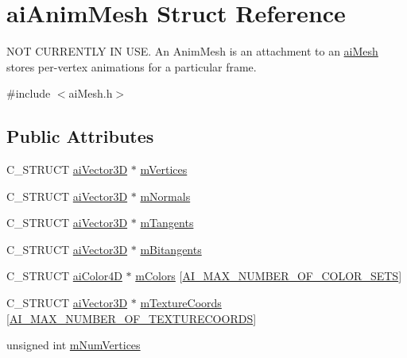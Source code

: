 \hypertarget{structai_anim_mesh}{\section{ai\-Anim\-Mesh Struct Reference}
\label{structai_anim_mesh}
}


N\-O\-T C\-U\-R\-R\-E\-N\-T\-L\-Y I\-N U\-S\-E. An Anim\-Mesh is an attachment to an \hyperlink{structai_mesh}{ai\-Mesh} stores per-\/vertex animations for a particular frame.  




{\ttfamily \#include $<$ai\-Mesh.\-h$>$}

\subsection*{Public Attributes}
\begin{DoxyCompactItemize}
\item 
C\-\_\-\-S\-T\-R\-U\-C\-T \hyperlink{structai_vector3_d}{ai\-Vector3\-D} $\ast$ \hyperlink{structai_anim_mesh_a0ac2dd4c1afd23e6a9293b1d0ded3060}{m\-Vertices}
\item 
C\-\_\-\-S\-T\-R\-U\-C\-T \hyperlink{structai_vector3_d}{ai\-Vector3\-D} $\ast$ \hyperlink{structai_anim_mesh_a64a07a8c5c419b1e006c5302bca4d334}{m\-Normals}
\item 
C\-\_\-\-S\-T\-R\-U\-C\-T \hyperlink{structai_vector3_d}{ai\-Vector3\-D} $\ast$ \hyperlink{structai_anim_mesh_a95dcc49c6d5ecc570ceb54552a0a9625}{m\-Tangents}
\item 
C\-\_\-\-S\-T\-R\-U\-C\-T \hyperlink{structai_vector3_d}{ai\-Vector3\-D} $\ast$ \hyperlink{structai_anim_mesh_a7d60acf4d2b4b59dcc6c88956bfae85f}{m\-Bitangents}
\item 
C\-\_\-\-S\-T\-R\-U\-C\-T \hyperlink{structai_color4_d}{ai\-Color4\-D} $\ast$ \hyperlink{structai_anim_mesh_a4f062d9fac71c6b367fdf0f8638e1ca5}{m\-Colors} \mbox{[}\hyperlink{ai_mesh_8h_a74ea1282873ac4b111b48d2380c26bdc}{A\-I\-\_\-\-M\-A\-X\-\_\-\-N\-U\-M\-B\-E\-R\-\_\-\-O\-F\-\_\-\-C\-O\-L\-O\-R\-\_\-\-S\-E\-T\-S}\mbox{]}
\item 
C\-\_\-\-S\-T\-R\-U\-C\-T \hyperlink{structai_vector3_d}{ai\-Vector3\-D} $\ast$ \hyperlink{structai_anim_mesh_ad24a0451adeb845a53eb2351b9462e0a}{m\-Texture\-Coords} \mbox{[}\hyperlink{ai_mesh_8h_a335874c5058c7f1e866eb953bf192258}{A\-I\-\_\-\-M\-A\-X\-\_\-\-N\-U\-M\-B\-E\-R\-\_\-\-O\-F\-\_\-\-T\-E\-X\-T\-U\-R\-E\-C\-O\-O\-R\-D\-S}\mbox{]}
\item 
unsigned int \hyperlink{structai_anim_mesh_a6bb0d45317a1bbea7f2b7f8191d0c436}{m\-Num\-Vertices}
\end{DoxyCompactItemize}


